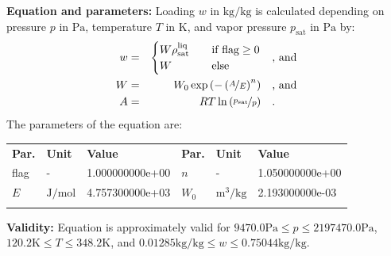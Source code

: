 \textbf{Equation and parameters:}
\newline
%
Loading $w$ in $\si{\kilogram\per\kilogram}$ is calculated depending on pressure $p$ in $\si{\pascal}$, temperature $T$ in $\si{\kelvin}$, and vapor pressure $p_\mathrm{sat}$ in $\si{\pascal}$ by:
%
\begin{equation*}
\begin{split}
w &=& \begin{cases} W \rho_\mathrm{sat}^{\mathrm{liq}} & \quad \text{if flag} \geq 0 \\ W & \quad \text{else} \end{cases} & \quad\text{, and} \\
W &=& W_0 \exp \left( - \left( \nicefrac{A}{E} \right) ^{n} \right) & \quad\text{, and} \\
A &=& R T \ln \left( \nicefrac{p_\mathrm{sat}}{p} \right) & \quad\text{.} \\
\end{split}
\end{equation*}
%
The parameters of the equation are:
%
\begin{longtable}[l]{lll|lll}
\toprule
\addlinespace
\textbf{Par.} & \textbf{Unit} & \textbf{Value} &	\textbf{Par.} & \textbf{Unit} & \textbf{Value} \\
\addlinespace
\midrule
\endhead

\bottomrule
\endfoot
\bottomrule
\endlastfoot
\addlinespace

flag & - & 1.000000000e+00 & $n$ & - & 1.050000000e+00 \\
$E$ & $\si{\joule\per\mole}$ & 4.757300000e+03 & $W_0$ & $\si{\cubic\meter\per\kilogram}$ & 2.193000000e-03 \\

\addlinespace\end{longtable}

\textbf{Validity:}
\newline
Equation is approximately valid for $9470.0 \si{\pascal} \leq p \leq 2197470.0 \si{\pascal}$,  $120.2 \si{\kelvin} \leq T \leq 348.2 \si{\kelvin}$, and $0.01285 \si{\kilogram\per\kilogram} \leq w \leq 0.75044 \si{\kilogram\per\kilogram}$.
\newline

